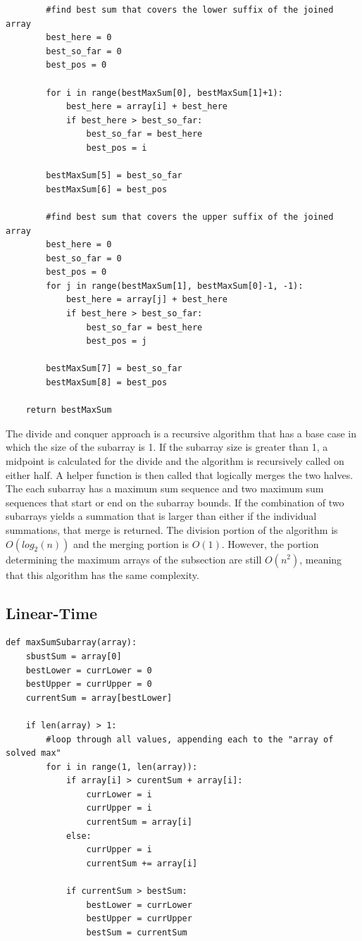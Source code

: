 \documentclass[letWterpaper,10pt,titlepage]{article}
\begin{document}
\begin{lstlisting}
        #find best sum that covers the lower suffix of the joined array
        best_here = 0
        best_so_far = 0
        best_pos = 0

        for i in range(bestMaxSum[0], bestMaxSum[1]+1):
            best_here = array[i] + best_here
            if best_here > best_so_far:
                best_so_far = best_here
                best_pos = i

        bestMaxSum[5] = best_so_far
        bestMaxSum[6] = best_pos

        #find best sum that covers the upper suffix of the joined array
        best_here = 0
        best_so_far = 0
        best_pos = 0
        for j in range(bestMaxSum[1], bestMaxSum[0]-1, -1):
            best_here = array[j] + best_here
            if best_here > best_so_far:
                best_so_far = best_here
                best_pos = j

        bestMaxSum[7] = best_so_far
        bestMaxSum[8] = best_pos

    return bestMaxSum
\end{lstlisting}

The divide and conquer approach is a recursive algorithm that has a base case in which the size of the subarray is 1. If the subarray size is greater than 1, a midpoint is calculated for the divide and the algorithm is recursively called on either half. A helper function is then called that logically merges the two halves. The each subarray has a maximum sum sequence and two maximum sum sequences that start or end on the subarray bounds. If the combination of two subarrays yields a summation that is larger than either if the individual summations, that merge is returned. The division portion of the algorithm is $O(log_2(n))$ and the merging portion is $O(1)$. However, the portion determining the maximum arrays of the subsection are still $O(n^2)$, meaning that this algorithm has the same complexity.

\subsection{Linear-Time}

\begin{lstlisting}
def maxSumSubarray(array):
    sbustSum = array[0]
    bestLower = currLower = 0
    bestUpper = currUpper = 0
    currentSum = array[bestLower]

    if len(array) > 1:
        #loop through all values, appending each to the "array of solved max"
        for i in range(1, len(array)):
            if array[i] > curentSum + array[i]:
                currLower = i
                currUpper = i
                currentSum = array[i]
            else:
                currUpper = i
                currentSum += array[i]

            if currentSum > bestSum:
                bestLower = currLower
                bestUpper = currUpper
                bestSum = currentSum
\end{lstlisting}
\end{document}
